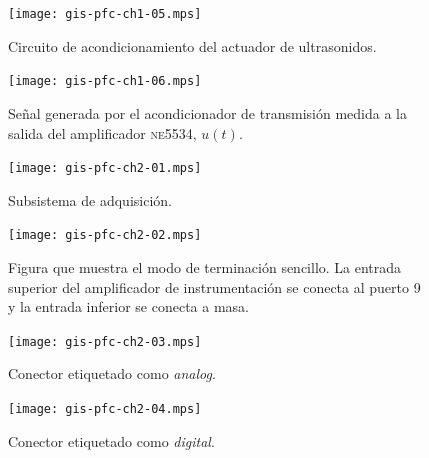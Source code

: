 \documentclass[a4paper,12pt]				{article}
\begin{document}
\begin{figure}
	\begin{center}
		\texttt{[image: gis-pfc-ch1-05.mps]}
	\end{center}
	\caption[Circuito de acondicionamiento del actuador
	piezoeléctrico]{Circuito de acondicionamiento del actuador de
	ultrasonidos.}
	\label{fig:newtxconditioner}
\end{figure}

\begin{figure}
	\begin{center}
		\texttt{[image: gis-pfc-ch1-06.mps]}
	\end{center}
	\caption[Señal a la salida del amplificador \textsc{ne5534},
	$u(t)$]{Señal generada por el acondicionador de transmisión medida
	a la salida del amplificador \textsc{ne5534}, $u(t)$.}
	\label{fig:txacvo}
\end{figure}

\begin{figure}
	\begin{center}
		\texttt{[image: gis-pfc-ch2-01.mps]}
	\end{center}
	\caption[Subsistema de adquisición]{Subsistema de adquisición.}
	\label{fig:subacqui}
\end{figure}

\clearpage

\begin{figure}
	\begin{center}
		\texttt{[image: gis-pfc-ch2-02.mps]}
	\end{center}
	\caption[Ejemplo de configuración de terminación]{Figura que
	muestra el modo de terminación sencillo. La entrada superior del
	amplificador de instrumentación se conecta al puerto 9 y la entrada
	inferior se conecta a masa.}
	\label{fig:termmodes}
\end{figure}

\begin{figure}
	\begin{center}
		\texttt{[image: gis-pfc-ch2-03.mps]}
	\end{center}
	\caption[Conector etiquetado como \emph{analog}]{Conector
	etiquetado como \emph{analog}.}
	\label{fig:analog}
\end{figure}

\begin{figure}
	\begin{center}
		\texttt{[image: gis-pfc-ch2-04.mps]}
	\end{center}
	\caption[Conector etiquetado como \emph{digital}]{Conector
	etiquetado como \emph{digital}.}
	\label{fig:digital}
\end{figure}
\end{document}
